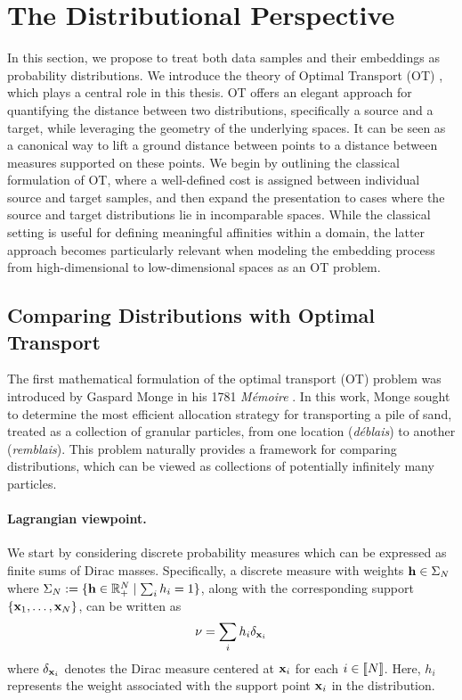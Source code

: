 \section{The Distributional Perspective}\label{sec:dist_perspective_dr}

In this section, we propose to treat both data samples and their embeddings as probability distributions. We introduce the theory of Optimal Transport (OT) \citep{villani2009optimal,peyre2019computational}, which plays a central role in this thesis. OT offers an elegant approach for quantifying the distance between two distributions, specifically a source and a target, while leveraging the geometry of the underlying spaces. It can be seen as a canonical way to lift a ground distance between points to a distance between measures supported on these points. We begin by outlining the classical formulation of OT, where a well-defined cost is assigned between individual source and target samples, and then expand the presentation to cases where the source and target distributions lie in incomparable spaces. While the classical setting is useful for defining meaningful affinities within a domain, the latter approach becomes particularly relevant when modeling the embedding process from high-dimensional to low-dimensional spaces as an OT problem.


\subsection{Comparing Distributions with Optimal Transport}\label{sec:background_ot}

The first mathematical formulation of the optimal transport (OT) problem was introduced by Gaspard Monge in his 1781 \textit{Mémoire} \citep{monge1781memoire}. In this work, Monge sought to determine the most efficient allocation strategy for transporting a pile of sand, treated as a collection of granular particles, from one location (\emph{déblais}) to another (\emph{remblais}). This problem naturally provides a framework for comparing distributions, which can be viewed as collections of potentially infinitely many particles.

\paragraph{Lagrangian viewpoint.} We start by considering discrete probability measures which can be expressed as finite sums of Dirac masses. Specifically, a discrete measure with weights ${\mathbf{h}} \in \Sigma_N$ where $\Sigma_N := \{{\mathbf{h}} \in \mathbb{R}_+^N \mid \sum_i h_i = 1\}$, along with the corresponding support $\{{\mathbf{x}}_1, \ldots, {\mathbf{x}}_N\}$, can be written as
\[
\nu = \sum_i h_i \delta_{{\mathbf{x}}_i}
\]
where $\delta_{{\mathbf{x}}_i}$ denotes the Dirac measure centered at ${\mathbf{x}}_i$ for each $i \in {[\![N]\!]}$. Here, \(h_i\) represents the weight associated with the support point \({\mathbf{x}}_i\) in the distribution.

